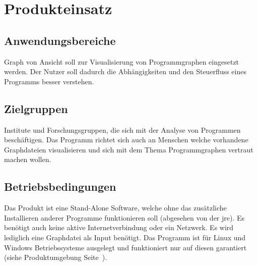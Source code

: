 \chapter{Produkteinsatz}

\section{Anwendungsbereiche}
Graph von Ansicht soll zur Visualisierung von Programmgraphen eingesetzt werden. Der Nutzer soll dadurch die Abhängigkeiten und den Steuerfluss eines Programms besser verstehen.
\section{Zielgruppen}
Institute und Forschungsgruppen, die sich mit der Analyse von Programmen beschäftigen. Das Programm richtet sich auch an Menschen welche vorhandene Graphdateien visualisieren und sich mit dem Thema Programmgraphen vertraut machen wollen.

\section{Betriebsbedingungen}
Das Produkt ist eine Stand-Alone Software, welche ohne das zusätzliche Installieren anderer Programme funktionieren soll (abgesehen von der \gls{jre}). Es benötigt auch keine aktive Internetverbindung oder ein Netzwerk. Es wird lediglich eine Graphdatei als Input benötigt. Das Programm ist für Linux und Windows Betriebssysteme ausgelegt und funktioniert nur auf diesen garantiert (siehe Produktumgebung Seite~\pageref{ch:umgebung}).
